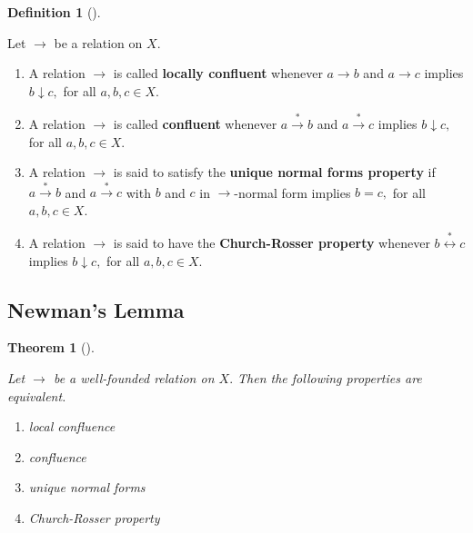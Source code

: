 \documentclass[
  letterpaper,
  10pt,
  reqno,
  twopage,
  openany]{book}
\providecommand{\tightlist}{%
  \setlength{\itemsep}{0pt}\setlength{\parskip}{0pt}}\usepackage{longtable,booktabs,array}
\theoremstyle{plain}
\theoremstyle{definition}
\theoremstyle{definition}
\newtheorem{definition}{Definition}[chapter]
\theoremstyle{definition}
\theoremstyle{plain}
\theoremstyle{plain}
\newtheorem{theorem}{Theorem}[chapter]
\theoremstyle{remark}
\begin{document}
\leavevmode{}%
\begin{definition}[]\label{def-confluence}

Let \(\longrightarrow\) be a relation on \(X.\)

\begin{enumerate}
\def\labelenumi{\arabic{enumi}.}
\tightlist
\item
  A relation \(\longrightarrow\) is called 
  \textbf{locally confluent} whenever \(a \longrightarrow b\) and
  \(a \longrightarrow c\) implies \(b \downarrow c,\) for all
  \(a,b,c\in X.\)
\item
  A relation \(\longrightarrow\) is called 
  \textbf{confluent} whenever \(a \stackrel{*}{\longrightarrow} b\) and
  \(a \stackrel{*}{\longrightarrow} c\) implies \(b \downarrow c,\) for
  all \(a,b,c\in X.\)
\item
  A relation \(\longrightarrow\) is said to satisfy the
   \textbf{unique normal forms
  property} if \(a \stackrel{*}{\longrightarrow} b\) and
  \(a \stackrel{*}{\longrightarrow} c\) with \(b\) and \(c\) in
  \(\longrightarrow\)-normal form implies \(b=c,\) for all
  \(a,b,c\in X.\)
\item
  A relation \(\longrightarrow\) is said to have the
   \textbf{Church-Rosser property}
  whenever \(b\stackrel{*}{\longleftrightarrow} c\) implies
  \(b\downarrow c,\) for all \(a,b,c\in X.\)\\
\end{enumerate}

\end{definition}

\hypertarget{newmans-lemma}{%
\subsection{Newman's Lemma}\label{newmans-lemma}}

\leavevmode{}%
\begin{theorem}[]\label{thm-Newman}

Let \(\longrightarrow\) be a well-founded relation on \(X.\) Then the
following properties are equivalent.

\begin{enumerate}
\def\labelenumi{\arabic{enumi}.}
\tightlist
\item
  local confluence
\item
  confluence
\item
  unique normal forms
\item
  Church-Rosser property
\end{enumerate}

\end{theorem}
\end{document}
